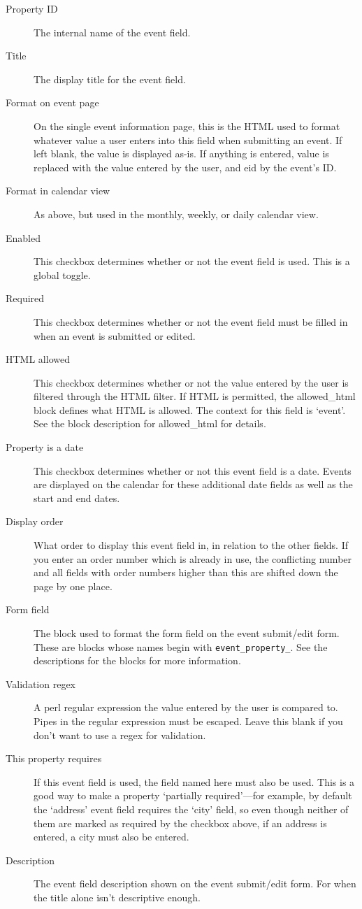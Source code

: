 \begin{description}
\item[Property ID] The internal name of the event field.
\item[Title] The display title for the event field.
\item[Format on event page] On the single event information page, this is the HTML used to format whatever value a user enters into this field when submitting an event. If left blank, the value is displayed as-is. If anything is entered, \latexhtml{$\vert$}{|}value\latexhtml{$\vert$}{|} is replaced with the value entered by the user, and \latexhtml{$\vert$}{|}eid\latexhtml{$\vert$}{|} by the event's ID.
\item[Format in calendar view] As above, but used in the monthly, weekly, or daily calendar view.
\item[Enabled] This checkbox determines whether or not the event field is used. This is a global toggle.
\item[Required] This checkbox determines whether or not the event field must be filled in when an event is submitted or edited.
\item[HTML allowed] This checkbox determines whether or not the value entered by the user is filtered through the HTML filter. If HTML is permitted, the allowed\_html block defines what HTML is allowed. The context for this field is `event'. See the block description for allowed\_html for details.
\item[Property is a date] This checkbox determines whether or not this event field is a date. Events are displayed on the calendar for these additional date fields as well as the start and end dates.
\item[Display order] What order to display this event field in, in relation to the other fields. If you enter an order number which is already in use, the conflicting number and all fields with order numbers higher than this are shifted down the page by one place.
\item[Form field] The block used to format the form field on the event submit/edit form. These are blocks whose names begin with \verb!event_property_!. See the descriptions for the blocks for more information.
\item[Validation regex] A perl regular expression the value entered by the user is compared to. Pipes in the regular expression must be escaped. Leave this blank if you don't want to use a regex for validation.
\item[This property requires] If this event field is used, the field named here must also be used. This is a good way to make a property `partially required'---for example, by default the `address' event field requires the `city' field, so even though neither of them are marked as required by the checkbox above, if an address is entered, a city must also be entered.
\item[Description] The event field description shown on the event submit/edit form. For when the title alone isn't descriptive enough.
\end{description}

